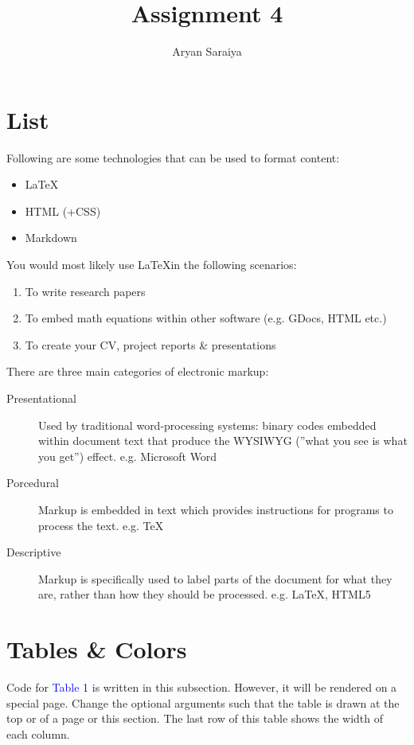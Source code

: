 \documentclass{article}
\title{Assignment 4}
\author{Aryan Saraiya}
\begin{document}
	\maketitle
	
	\section{List}
	Following are some technologies that can be used to format content:
	\begin{itemize}
		\item \LaTeX
		\item HTML (+CSS)
		\item Markdown
	\end{itemize}
	
	\noindent You would most likely use \LaTeX \quad in the following scenarios:
	
	\begin{enumerate}
		\item To write research papers
		\item To embed math equations within other software (e.g. GDocs, HTML etc.)
		\item To create your CV, project reports \& presentations
	\end{enumerate}
	
	\noindent There are three main categories of electronic markup:
	
	\begin{description}
		\item[Presentational] Used by traditional word-processing systems: binary codes embedded
		within document text that produce the WYSIWYG (”what you see is what you
		get”) effect. e.g. Microsoft Word
		\item[Porcedural] Markup is embedded in text which provides instructions for programs to
		process the text. e.g. \TeX
		\item[Descriptive] Markup is specifically used to label parts of the document for what they
		are, rather than how they should be processed. e.g. \LaTeX, HTML5
	\end{description}
	
	\section{Tables \& Colors}
	
	Code for \textcolor{blue}{Table 1} is written in this subsection. However, it will be rendered on a
	special page. Change the optional arguments such that the table is drawn at the top
	or  of a page or  this section. The last row of this table shows the width
	of each column.
	
\end{document}
